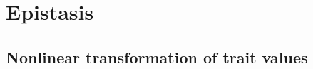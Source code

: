 \documentclass{article}
\begin{document}
\section{Epistasis}
\subsection{Nonlinear transformation of trait values}

\end{document}
